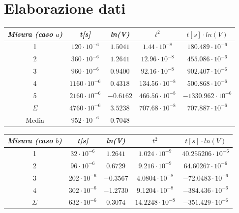     \section{Elaborazione dati}

    \begin{center}
    \begin{tabular}{|c|c|c|c|c|}
        \hline
        \textit{Misura (caso $a$)} & \textit{t[s]} & \textit{ln(V)} & \textit{$t^2$} & \textit{$t[s] \cdot ln(V)$} \\
        \hline
        1 & $120 \cdot 10^{-6}$ & $1.5041$ & $1.44 \cdot 10^{-8}$ & $180.489 \cdot 10^{-6}$ \\
        \hline
        2 & $360 \cdot 10^{-6}$ & $1.2641$ & $12.96 \cdot 10^{-8}$ & $455.086 \cdot 10^{-6}$ \\
        \hline
        3 & $960 \cdot 10^{-6}$ & $0.9400$ & $92.16 \cdot 10^{-8}$ & $902.407 \cdot 10^{-6}$ \\
        \hline
        4 & $1160 \cdot 10^{-6}$ & $0.4318$ & $134.56 \cdot 10^{-8}$ & $500.868 \cdot 10^{-6}$ \\
        \hline
        5 & $2160 \cdot 10^{-6}$ & $-0.6162$ & $466.56 \cdot 10^{-8}$ & $-1330.962 \cdot 10^{-6}$ \\
        \hline
        $\varSigma$ & $4760 \cdot 10^{-6}$ & $3.5238$ & $707.68 \cdot 10^{-8}$ & $707.887 \cdot 10^{-6}$ \\
        \hline
        Media & $952 \cdot 10^{-6}$ & $0.7048$ & \multicolumn{2}{c}{} \\
        \hline
    \end{tabular}
    \begin{tabular}{|c|c|c|c|c|}
        \hline
        \textit{Misura (caso $b$)} & \textit{t[s]} & \textit{ln(V)} & \textit{$t^2$} & \textit{$t[s] \cdot ln(V)$} \\
        \hline
        1 & $32 \cdot 10^{-6}$ & $1.2641$ & $1.024 \cdot 10^{-9}$ & $40.255206 \cdot 10^{-6}$ \\
        \hline
        2 & $96 \cdot 10^{-6}$ & $0.6729$ & $9.216 \cdot 10^{-9}$ & $64.60267 \cdot 10^{-6}$ \\
        \hline
        3 & $202 \cdot 10^{-6}$ & $-0.3567$ & $4.0804 \cdot 10^{-8}$ & $-72.0483 \cdot 10^{-6}$ \\
        \hline
        4 & $302 \cdot 10^{-6}$ & $-1.2730$ & $9.1204 \cdot 10^{-8}$ & $-384.436 \cdot 10^{-6}$ \\
        \hline
        $\varSigma$ & $632 \cdot 10^{-6}$ & $0.3074$ & $14.2248 \cdot 10^{-8}$ & $-351.429 \cdot 10^{-6}$ \\

\end{tabular}
\end{center}
